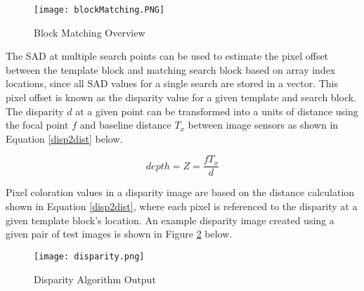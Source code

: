 \begin{figure}[H]
	\centerline{\texttt{[image: blockMatching.PNG]}}
	\caption{Block Matching Overview \cite{collins}}
	\label{blockMatching}
\end{figure}
\par
The SAD at multiple search points can be used to estimate the pixel offset between the template block and matching search block based on array index locations, since all SAD values for a single search are stored in a vector. This pixel offset is known as the disparity value for a given template and search block. The disparity $d$ at a given point can be transformed into a units of distance using the focal point $f$ and baseline distance $T_x$ between image sensors as shown in Equation \ref{disp2dist} below. 
\par
\begin{equation}\label{disp2dist}
depth = Z = \frac{fT_x}{d}
\end{equation}
\par
Pixel coloration values in a disparity image are based on the distance calculation shown in Equation \ref{disp2dist}, where each pixel is referenced to the disparity at a given template block's location. An example disparity image created using a given pair of test images is shown in Figure \ref{disparityOutput} below. 
\par
\begin{figure}[H]
	\centerline{\texttt{[image: disparity.png]}}
	\caption{Disparity Algorithm Output}
	\label{disparityOutput}
\end{figure}